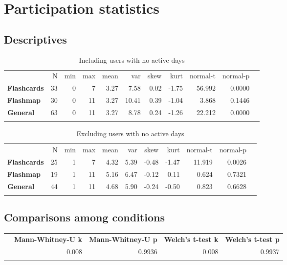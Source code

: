 \chapter{Participation statistics}
\label{app:participation}

\section{Descriptives}

\begin{longtable}[c]{@{}lrrrrrrrrrr@{}}
    \caption{Including users with no active days}
\endfirsthead
\toprule\addlinespace
& N & min & max & mean & var & skew & kurt & normal-t & normal-p
\\\addlinespace
\midrule
\textbf{Flashcards} & 33 & 0 & 7 & 3.27 & 7.58 & 0.02 & -1.75 & 56.992 &
0.0000
\\\addlinespace
\textbf{Flashmap} & 30 & 0 & 11 & 3.27 & 10.41 & 0.39 & -1.04 & 3.868 &
0.1446
\\\addlinespace
\textbf{General} & 63 & 0 & 11 & 3.27 & 8.78 & 0.24 & -1.26 & 22.212 &
0.0000
\\\addlinespace
\bottomrule
    \label{tab:participation_incl}
\end{longtable}

\begin{longtable}[c]{@{}lrrrrrrrrrr@{}}
    \caption{Excluding users with no active days}
\endfirsthead
\toprule\addlinespace
& N & min & max & mean & var & skew & kurt & normal-t & normal-p
\\\addlinespace
\midrule
\textbf{Flashcards} & 25 & 1 & 7 & 4.32 & 5.39 & -0.48 & -1.47 & 11.919
& 0.0026
\\\addlinespace
\textbf{Flashmap} & 19 & 1 & 11 & 5.16 & 6.47 & -0.12 & 0.11 & 0.624 &
0.7321
\\\addlinespace
\textbf{General} & 44 & 1 & 11 & 4.68 & 5.90 & -0.24 & -0.50 & 0.823 &
0.6628
\\\addlinespace
\bottomrule
    \label{tab:participation_excl}
\end{longtable}

\FloatBarrier
\section{Comparisons among conditions}

\begin{longtable}[c]{@{}lrrrr@{}}
\toprule\addlinespace
& \textbf{Mann-Whitney-U k} & \textbf{Mann-Whitney-U p} &
\textbf{Welch's t-test k} & \textbf{Welch's t-test p}
\\\addlinespace
\midrule\endhead
& 0.008 & 0.9936 & 0.008 & 0.9937
\\\addlinespace
\bottomrule
    \label{tab:participation-comp}
\end{longtable}

